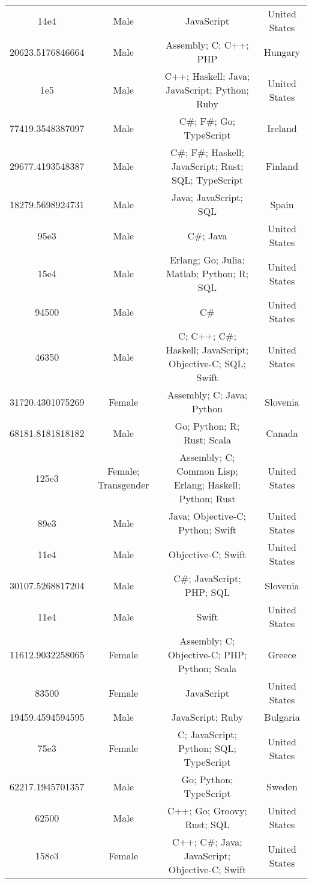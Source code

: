 \begin{center}
\begin{tabular}{ |c|c|c|c| }
14e4  &  Male  &  JavaScript  &  United States  \\ 
20623.5176846664  &  Male  &  Assembly; C; C++; PHP  &  Hungary  \\ 
1e5  &  Male  &  C++; Haskell; Java; JavaScript; Python; Ruby  &  United States  \\ 
77419.3548387097  &  Male  &  C\#; F\#; Go; TypeScript  &  Ireland  \\ 
29677.4193548387  &  Male  &  C\#; F\#; Haskell; JavaScript; Rust; SQL; TypeScript  &  Finland  \\ 
18279.5698924731  &  Male  &  Java; JavaScript; SQL  &  Spain  \\ 
95e3  &  Male  &  C\#; Java  &  United States  \\ 
15e4  &  Male  &  Erlang; Go; Julia; Matlab; Python; R; SQL  &  United States  \\ 
94500  &  Male  &  C\#  &  United States  \\ 
46350  &  Male  &  C; C++; C\#; Haskell; JavaScript; Objective-C; SQL; Swift  &  United States  \\ 
31720.4301075269  &  Female  &  Assembly; C; Java; Python  &  Slovenia  \\ 
68181.8181818182  &  Male  &  Go; Python; R; Rust; Scala  &  Canada  \\ 
125e3  &  Female; Transgender  &  Assembly; C; Common Lisp; Erlang; Haskell; Python; Rust  &  United States  \\ 
89e3  &  Male  &  Java; Objective-C; Python; Swift  &  United States  \\ 
11e4  &  Male  &  Objective-C; Swift  &  United States  \\ 
30107.5268817204  &  Male  &  C\#; JavaScript; PHP; SQL  &  Slovenia  \\ 
11e4  &  Male  &  Swift  &  United States  \\ 
11612.9032258065  &  Female  &  Assembly; C; Objective-C; PHP; Python; Scala  &  Greece  \\ 
83500  &  Female  &  JavaScript  &  United States  \\ 
19459.4594594595  &  Male  &  JavaScript; Ruby  &  Bulgaria  \\ 
75e3  &  Female  &  C; JavaScript; Python; SQL; TypeScript  &  United States  \\ 
62217.1945701357  &  Male  &  Go; Python; TypeScript  &  Sweden  \\ 
62500  &  Male  &  C++; Go; Groovy; Rust; SQL  &  United States  \\ 
158e3  &  Female  &  C++; C\#; Java; JavaScript; Objective-C; Swift  &  United States  \\ 

\end{tabular}
\end{center}
